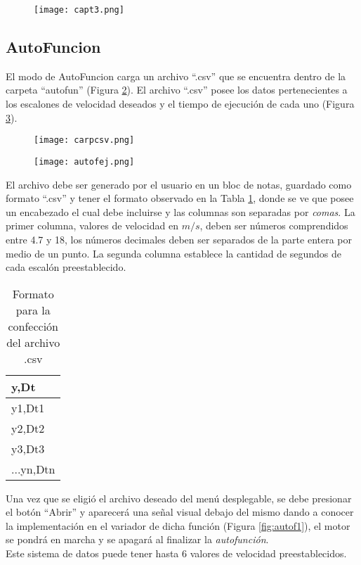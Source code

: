 \begin{figure}[H]
	\centering
	\texttt{[image: capt3.png]}
	\label{fig:capt3}
\end{figure}

\subsection{AutoFuncion}
El modo de AutoFuncion carga un archivo “.csv” que se encuentra dentro de la carpeta “autofun” (Figura \ref{fig:autof2}). El archivo “.csv” posee los datos pertenecientes a los escalones de velocidad deseados y el tiempo de ejecución de cada uno (Figura \ref{fig:autof22}).

\begin{figure}[H]
	\centering
	\texttt{[image: carpcsv.png]}
	\label{fig:autof2}
\end{figure}

\begin{figure}[H]
	\centering
	\texttt{[image: autofej.png]}
	\label{fig:autof22}
\end{figure}

El archivo debe ser generado por el usuario en un bloc de notas, guardado como formato  ``.csv'' y tener el formato observado en la Tabla \ref{tab:formcsv}, donde se ve que posee un encabezado el cual debe incluirse y las columnas son separadas por \textit{comas}. La primer columna, valores de velocidad en $m/s$, deben ser números comprendidos entre 4.7 y 18, los números decimales deben ser separados de la parte entera por medio de un punto. La segunda columna establece la cantidad de segundos de cada escalón preestablecido.
\begin{table}[h]
	\centering
	\begin{tabular}{|l|}
		\hline
		y,Dt \\ \hline
		y1,Dt1 \\ \hline
		y2,Dt2 \\ \hline
		y3,Dt3 \\ \hline
		...yn,Dtn \\ \hline
	\end{tabular}
	
	\caption{Formato para la confección del archivo .csv}
	\label{tab:formcsv}
\end{table}


Una vez que se eligió el archivo deseado del menú desplegable, se debe presionar el botón ``Abrir'' y aparecerá una señal visual debajo del mismo dando a conocer la implementación en el variador de dicha función (Figura \ref{fig:autof1}), el motor se pondrá en marcha y se apagará al finalizar la \textit{autofunción}.\\
Este sistema de datos puede tener hasta 6 valores de velocidad preestablecidos.

